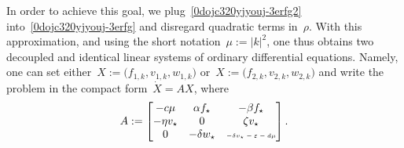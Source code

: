 \documentclass[12pt]{amsart}
\renewcommand{\epsilon}{\varepsilon}
\numberwithin{equation}{section}
\begin{document}
In order to achieve this goal, we plug~\eqref{0dojc320yjyouj-3erfg2}
into~\eqref{0dojc320yjyouj-3erfg} and disregard quadratic terms in~$\rho$.
With this approximation, 
and using the short notation~$\mu:=|k|^2$,
one thus obtains
%
%
two decoupled and identical
linear systems of ordinary differential equations.
Namely, one can set either~$X:=\big( f_{1,k},v_{1,k},w_{1,k}\big)$ or~$X:=\big( 
f_{2,k},v_{2,k},w_{2,k}\big)$ and write the problem in the compact form~$\dot X= AX$, where
\begin{equation}\label{AMATRIX} A:=\begin{bmatrix}
-c\mu & \alpha f_\star & -\beta f_\star \\
-\eta v_\star &0&\zeta v_\star\\
0&-\delta w_\star &\tiny{\mbox{$-\delta v_\star -\epsilon -d\mu$}}
\end{bmatrix}.\end{equation}
\end{document}
